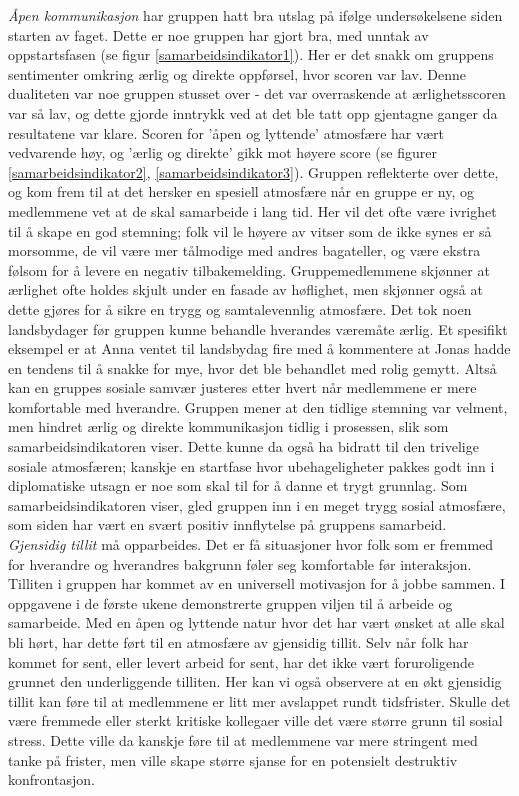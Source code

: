 \emph{Åpen kommunikasjon} har gruppen hatt bra utslag på ifølge undersøkelsene siden starten av faget. 
Dette er noe gruppen har gjort bra, med unntak av oppstartsfasen (se figur \ref{samarbeidsindikator1}).
Her er det snakk om gruppens sentimenter omkring ærlig og direkte oppførsel, hvor scoren var lav.
Denne dualiteten var noe gruppen stusset over - det var overraskende at ærlighetsscoren var så lav, og dette gjorde inntrykk ved at det ble tatt opp gjentagne ganger da resultatene var klare.
Scoren for 'åpen og lyttende' atmosfære har vært vedvarende høy, og 'ærlig og direkte' gikk mot høyere score (se figurer \ref{samarbeidsindikator2}, \ref{samarbeidsindikator3}).
Gruppen reflekterte over dette, og kom frem til at det hersker en spesiell atmosfære når en gruppe er ny, og medlemmene vet at de skal samarbeide i lang tid.
Her vil det ofte være ivrighet til å skape en god stemning; folk vil le høyere av vitser som de ikke synes er så morsomme, de vil være mer tålmodige med andres bagateller, og være ekstra følsom for å levere en negativ tilbakemelding.
Gruppemedlemmene skjønner at ærlighet ofte holdes skjult under en fasade av høflighet, men skjønner også at dette gjøres for å sikre en trygg og samtalevennlig atmosfære. Det tok noen landsbydager før gruppen kunne behandle hverandes væremåte ærlig.
Et spesifikt eksempel er at Anna ventet til landsbydag fire med å kommentere at Jonas hadde en tendens til å snakke for mye, hvor det ble behandlet med rolig gemytt. 
Altså kan en gruppes sosiale samvær justeres etter hvert når medlemmene er mere komfortable med hverandre. 
Gruppen mener at den tidlige stemning var velment, men hindret ærlig og direkte kommunikasjon tidlig i prosessen, slik som samarbeidsindikatoren viser. 
Dette kunne da også ha bidratt til den trivelige sosiale atmosfæren; kanskje en startfase hvor ubehageligheter pakkes godt inn i diplomatiske utsagn er noe som skal til for å danne et trygt grunnlag.
Som samarbeidsindikatoren viser, gled gruppen inn i en meget trygg sosial atmosfære, som siden har vært en svært positiv innflytelse på gruppens samarbeid.\\

\emph{Gjensidig tillit} må opparbeides. 
Det er få situasjoner hvor folk som er fremmed for hverandre og hverandres bakgrunn føler seg komfortable før interaksjon.
Tilliten i gruppen har kommet av en universell motivasjon for å jobbe sammen. 
I oppgavene i de første ukene demonstrerte gruppen viljen til å  arbeide og samarbeide.
Med en åpen og lyttende natur hvor det har vært ønsket at alle skal bli hørt, har dette ført til en atmosfære av gjensidig tillit. 
Selv når folk har kommet for sent, eller levert arbeid for sent, har det ikke vært foruroligende grunnet den underliggende tilliten.
Her kan vi også observere at en økt gjensidig tillit kan føre til at medlemmene er litt mer avslappet rundt tidsfrister. Skulle det være fremmede eller sterkt kritiske kollegaer ville det være større grunn til sosial stress.
Dette ville da kanskje føre til at medlemmene var mere stringent med tanke på frister, men ville skape større sjanse for en potensielt destruktiv konfrontasjon.\\


